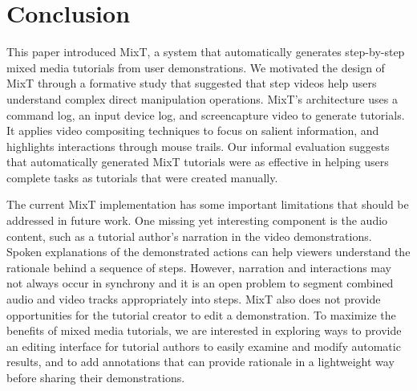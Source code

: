 \section{Conclusion}

This paper introduced MixT, a system that automatically generates step-by-step mixed media tutorials from user demonstrations. We motivated the design of MixT through a formative study that suggested that step videos help users understand complex direct manipulation operations. MixT’s architecture uses a command log, an input device log, and screencapture video to generate tutorials. It applies video compositing techniques to focus on salient information, and highlights interactions through mouse trails. Our informal evaluation suggests that automatically generated MixT tutorials were as effective in helping users complete tasks as tutorials that were created manually.


The current MixT implementation has some important limitations that should be addressed in future work. One missing yet interesting component is the audio content, such as a tutorial author's narration in the video demonstrations. Spoken explanations of the demonstrated actions can help viewers understand the rationale behind a sequence of steps. However, narration and interactions may not always occur in synchrony and it is an open problem to segment combined audio and video tracks appropriately into steps. MixT also does not provide opportunities for the tutorial creator to edit a demonstration. To maximize the benefits of mixed media tutorials, we are interested in exploring ways to provide an editing interface for tutorial authors to easily examine and modify automatic results, and to add annotations that can provide rationale in a lightweight way before sharing their demonstrations.

